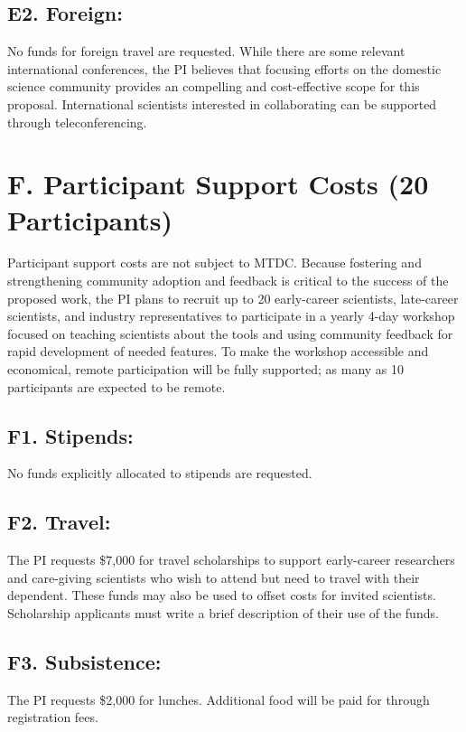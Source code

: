 \documentclass[11pt,oneside]{memoir}
\begin{document}
\subsection{E2. Foreign:}
No funds for foreign travel are requested.  While there are some relevant international conferences, the PI believes that focusing efforts on the domestic science community provides an compelling and cost-effective scope for this proposal.  International scientists interested in collaborating can be supported through teleconferencing.


\section*{F. Participant Support Costs (20 Participants)} 
Participant support costs are not subject to MTDC.  Because fostering and strengthening community adoption and feedback is critical to the success of the proposed work, the PI plans to recruit up to 20 early-career scientists, late-career scientists, and industry representatives to participate in a yearly 4-day workshop focused on teaching scientists about the tools and using community feedback for rapid development of needed features.  To make the workshop accessible and economical, remote participation will be fully supported; as many as 10 participants are expected to be remote.

\subsection*{F1. Stipends:}  
No funds explicitly allocated to stipends are requested.

\subsection*{F2. Travel:} 
The PI requests \$7,000 for travel scholarships to support early-career researchers and care-giving scientists who wish to attend but need to travel with their dependent.  These funds may also be used to offset costs for invited scientists.  Scholarship applicants must write a brief description of their use of the funds.

\subsection*{F3. Subsistence:}  The PI requests \$2,000 for lunches.  Additional food will be paid for through registration fees.
\end{document}
